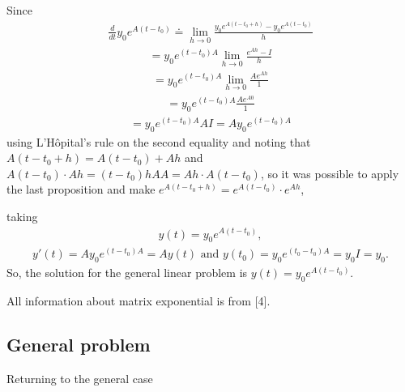 \documentclass[letterpaper,10pt,english]{jupyterBook}
\begin{document}
\sphinxAtStartPar
Since
\begin{equation*}
\begin{split}
    \frac{d}{dt}y_0e^{A(t-t_0)} \doteq \lim_{h\to0} \frac{y_0e^{A(t-t_0+h)}-y_0e^{A(t-t_0)}}{h}
\end{split}
\end{equation*}\begin{equation*}
\begin{split}
    = y_0e^{(t-t_0)A}\lim_{h\to0} \frac{e^{Ah}-I}{h} 
\end{split}
\end{equation*}\begin{equation*}
\begin{split}
    = y_0e^{(t-t_0)A}\lim_{h\to0} \frac{Ae^{Ah}}{1} 
\end{split}
\end{equation*}\begin{equation*}
\begin{split}
    = y_0e^{(t-t_0)A} \frac{Ae^{A0}}{1}
\end{split}
\end{equation*}\begin{equation*}
\begin{split}
    = y_0e^{(t-t_0)A} A I = A y_0e^{(t-t_0)A} 
\end{split}
\end{equation*}
\sphinxAtStartPar
using L’Hôpital’s rule on the second equality and noting that \(A(t-t_0+h) = A(t-t_0)+Ah\) and \(A(t-t_0) \cdot Ah = (t-t_0)hAA = Ah \cdot A(t-t_0)\), so it was possible to apply the last proposition and make \(e^{A(t-t_0+h)} = e^{A(t-t_0)} \cdot e^{Ah}\),

\sphinxAtStartPar
taking
\begin{equation*}
\begin{split}
    y(t) = y_0e^{A(t-t_0)},
\end{split}
\end{equation*}\begin{equation*}
\begin{split}
    y'(t) = A y_0 e^{(t-t_0)A} = A y(t) \text{ and } y(t_0) = y_0 e^{(t_0-t_0)A} = y_0 I = y_0.
\end{split}
\end{equation*}
\sphinxAtStartPar
So, the solution for the general linear problem is \(y(t)=y_0 e^{A(t-t_0)}\).

\sphinxAtStartPar
All information about matrix exponential is from {[}4{]}.


\subsection{General problem}
\label{\detokenize{cap3:general-problem}}
\sphinxAtStartPar
Returning to the general case
\end{document}
